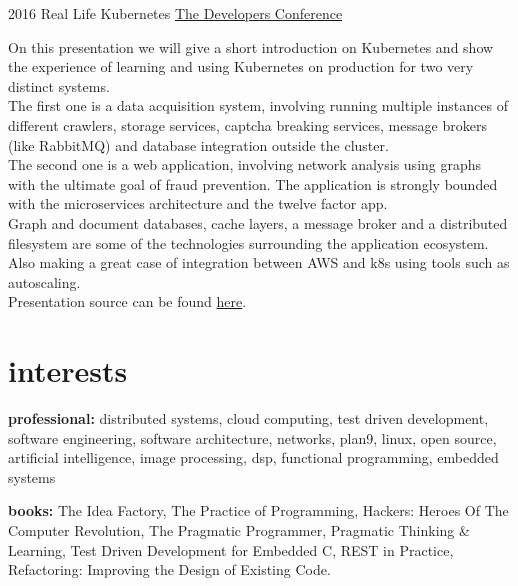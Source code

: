 \documentclass[]{friggeri-cv} %
\begin{document}
\begin{entrylist}
\entry
{2016}
{Real Life Kubernetes}
{\href{http://www.thedevelopersconference.com.br/tdc/2016/florianopolis/trilha-devops}{The Developers Conference}}
{

On this presentation we will give a short introduction on Kubernetes and show the experience of learning
and using Kubernetes on production for two very distinct systems.\\

The first one is a data acquisition system, involving running multiple instances of different crawlers,
storage services, captcha breaking services, message brokers (like RabbitMQ) and database integration outside the cluster.\\

The second one is a web application, involving network analysis using graphs with the ultimate goal of fraud prevention.
The application is strongly bounded with the microservices architecture and the twelve factor app.\\

Graph and document databases, cache layers, a message broker and a distributed filesystem are some of
the technologies surrounding the application ecosystem.\\

Also making a great case of integration between AWS and k8s using tools such as autoscaling.\\

Presentation source can be found \href{https://github.com/katcipis/my.presentations/tree/master/real-life-kubernetes}{here}.

}
\end{entrylist}

\pagebreak


\section{interests}

\textbf{professional:} distributed systems, cloud computing, test driven development, software engineering, software architecture, networks, plan9, linux, open source, artificial intelligence, image processing, dsp, functional programming, embedded systems

\textbf{books:} The Idea Factory, The Practice of Programming, Hackers: Heroes Of The Computer Revolution, The Pragmatic Programmer, Pragmatic Thinking \& Learning, Test Driven Development for Embedded C, REST in Practice, Refactoring: Improving the Design of Existing Code.
\end{document}
